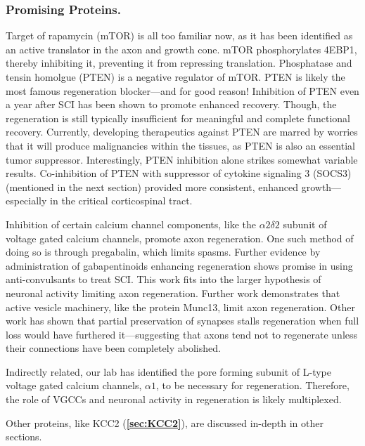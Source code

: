 \documentclass[12pt]{report}
\begin{document}
\subsubsection{Promising Proteins.}

Target of rapamycin (mTOR) is all too familiar now, as it has been identified as an active translator in the axon and growth cone. mTOR phosphorylates 4EBP1, thereby inhibiting it, preventing it from repressing translation. Phosphatase and tensin homolgue (PTEN) is a negative regulator of mTOR. PTEN is likely the most famous regeneration blocker---and for good reason! Inhibition of PTEN even a year after SCI has been shown to promote enhanced recovery. Though, the regeneration is still typically insufficient for meaningful and complete functional recovery. Currently, developing therapeutics against PTEN are marred by worries that it will produce malignancies within the tissues, as PTEN is also an essential tumor suppressor. Interestingly, PTEN inhibition alone strikes somewhat variable results. Co-inhibition of PTEN with suppressor of cytokine signaling 3 (SOCS3) (mentioned in the next section) provided more consistent, enhanced growth---especially in the critical corticospinal tract.\newline 

Inhibition of certain calcium channel components, like the $\alpha2\delta2$ subunit of voltage gated calcium channels, promote axon regeneration. One such method of doing so is through pregabalin, which limits spasms. Further evidence by administration of gabapentinoids enhancing regeneration shows promise in using anti-convulsants to treat SCI. This work fits into the larger hypothesis of neuronal activity limiting axon regeneration. Further work demonstrates that active vesicle machinery, like the protein Munc13, limit axon regeneration. Other work has shown that partial preservation of synapses stalls regeneration when full loss would have furthered it---suggesting that axons tend not to regenerate unless their connections have been completely abolished.\newline

Indirectly related, our lab has identified the pore forming subunit of L-type voltage gated calcium channels, $\alpha1$, to be necessary for regeneration. Therefore, the role of VGCCs and neuronal activity in regeneration is likely multiplexed.\newline

Other proteins, like KCC2 (\textbf{\ref{sec:KCC2}}), are discussed in-depth in other sections. 
\end{document}
